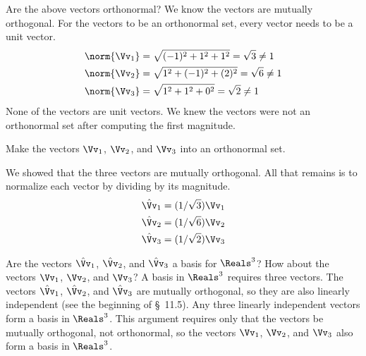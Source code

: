 \documentclass[12pt,ragged]{pajarticle}
\begin{document}
\begin{question}{6}{%
Are the above vectors orthonormal?}{%
We know the vectors are mutually orthogonal. For the vectors to be an orthonormal set, every vector needs to be a unit vector.
\begin{align*}
	\norm{\Vv_1} &= \sqrt{(-1)^2 + 1^2 + 1^2} = \sqrt{3} \ne 1 \\
	\norm{\Vv_2} &= \sqrt{1^2 + (-1)^2 + (2)^2} = \sqrt{6} \ne 1 \\
	\norm{\Vv_3} &= \sqrt{1^2 + 1^2 + 0^2} = \sqrt{2} \ne 1
\end{align*}
None of the vectors are unit vectors. We knew the vectors were not an orthonormal set after computing the first magnitude.
}
\end{question}

\begin{question}{7}{%
Make the vectors $\Vv_1$, $\Vv_2$, and $\Vv_3$ into	an orthonormal set.}{%
We showed that the three vectors are mutually orthogonal. All that remains is to normalize each vector by dividing by its magnitude.
\begin{align*}
	\hat{\Vv}_1 &= (1/\sqrt{3})\Vv_1 \\
	\hat{\Vv}_2 &= (1/\sqrt{6})\Vv_2 \\
	\hat{\Vv}_3 &= (1/\sqrt{2})\Vv_3	
\end{align*}

}
\end{question}

\begin{question}{8}{%
Are the vectors $\hat{\Vv}_1$, $\hat{\Vv}_2$, and $\hat{\Vv}_3$ a basis for $\Reals^3$? How about the vectors $\Vv_1$, $\Vv_2$, and $\Vv_3$?}{
A basis in $\Reals^3$ requires three vectors. The vectors $\hat{\Vv}_1$, $\hat{\Vv}_2$, and $\hat{\Vv}_3$ are mutually orthogonal, so they are also linearly independent (see the beginning of \S~11.5). Any three linearly independent vectors form a basis in $\Reals^3$. This argument requires only that the vectors be mutually orthogonal, not orthonormal, so the vectors $\Vv_1$, $\Vv_2$, and $\Vv_3$ also form a basis in $\Reals^3$.
}
\end{question}
\end{document}
